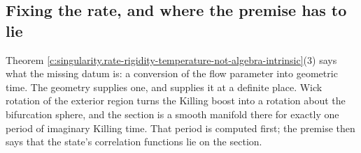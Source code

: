 \documentclass[11pt]{article}
\theoremstyle{definition}
\theoremstyle{plain}
\begin{document}
\subsection*{Fixing the rate, and where the premise has to lie}
\label{c:note.singularity.setting-fixing-rate-where-premise-has}
Theorem \ref{c:singularity.rate-rigidity-temperature-not-algebra-intrinsic}(3) says what the missing datum is: a conversion of the flow parameter into geometric time. The geometry supplies one, and supplies it at a definite place. Wick rotation of the exterior region turns the Killing boost into a rotation about the bifurcation sphere, and the section is a smooth manifold there for exactly one period of imaginary Killing time. That period is computed first; the premise then says that the state's correlation functions lie on the section.
\end{document}
